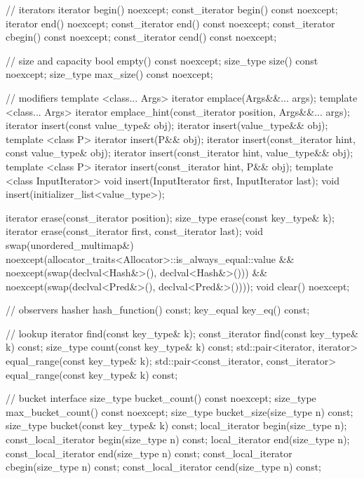 \begin{codeblock}
{{    // iterators
    iterator       begin() noexcept;
    const_iterator begin() const noexcept;
    iterator       end() noexcept;
    const_iterator end() const noexcept;
    const_iterator cbegin() const noexcept;
    const_iterator cend() const noexcept;

    // size and capacity
    bool      empty() const noexcept;
    size_type size() const noexcept;
    size_type max_size() const noexcept;

    // modifiers
    template <class... Args> iterator emplace(Args&&... args);
    template <class... Args> iterator emplace_hint(const_iterator position, Args&&... args);
    iterator insert(const value_type& obj);
    iterator insert(value_type&& obj);
    template <class P> iterator insert(P&& obj);
    iterator insert(const_iterator hint, const value_type& obj);
    iterator insert(const_iterator hint, value_type&& obj);
    template <class P> iterator insert(const_iterator hint, P&& obj);
    template <class InputIterator> void insert(InputIterator first, InputIterator last);
    void insert(initializer_list<value_type>);

    iterator  erase(const_iterator position);
    size_type erase(const key_type& k);
    iterator  erase(const_iterator first, const_iterator last);
    void      swap(unordered_multimap&)
      noexcept(allocator_traits<Allocator>::is_always_equal::value &&
               noexcept(swap(declval<Hash&>(), declval<Hash&>())) &&
               noexcept(swap(declval<Pred&>(), declval<Pred&>())));
    void      clear() noexcept;

    // observers
    hasher hash_function() const;
    key_equal key_eq() const;

    // lookup
    iterator       find(const key_type& k);
    const_iterator find(const key_type& k) const;
    size_type      count(const key_type& k) const;
    std::pair<iterator, iterator>             equal_range(const key_type& k);
    std::pair<const_iterator, const_iterator> equal_range(const key_type& k) const;

    // bucket interface
    size_type bucket_count() const noexcept;
    size_type max_bucket_count() const noexcept;
    size_type bucket_size(size_type n) const;
    size_type bucket(const key_type& k) const;
    local_iterator begin(size_type n);
    const_local_iterator begin(size_type n) const;
    local_iterator end(size_type n);
    const_local_iterator end(size_type n) const;
    const_local_iterator cbegin(size_type n) const;
    const_local_iterator cend(size_type n) const;

}}
\end{codeblock}
